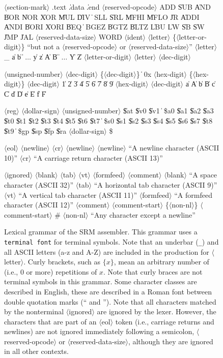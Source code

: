 \documentclass[11pt,letterpaper]{article}
\renewcommand{\nonterm}[1]{\mbox{$\langle$\textrm{#1}$\rangle$}}
\renewcommand{\arbno}[1]{\{#1\}}
\begin{document}
\begin{figure}
\begin{grammar}
\nonterm{section-mark} \: .text \| .data \| .end
\nonterm{reserved-opcode} \: ADD \| SUB \| AND \| BOR \| NOR \| XOR \| MUL \| DIV
\> \| \> SLL \| SRL \| MFHI \| MFLO \| JR \| ADDI \| ANDI \| BORI \| XORI \| BEQ
\> \| \> BGEZ \| BGTZ \| BLTZ \| LBU \| LW \| SB \| SW \| JMP \| JAL
\nonterm{reserved-data-size} \: WORD
\nonterm{ident} \: \nonterm{letter} \arbno{\nonterm{letter-or-digit}} \textrm{``but not a \nonterm{reserved-opcode} or \nonterm{reserved-data-size}''}
\nonterm{letter} \: \_ \| a \| b \| $\ldots$ \| y \| z \| A \| B \| $\ldots$ \| Y \| Z
\nonterm{letter-or-digit} \: \nonterm{letter} \| \nonterm{dec-digit}

\nonterm{unsigned-number} \: \nonterm{dec-digit} \arbno{\nonterm{dec-digit}}
 \> \| \> 0x \nonterm{hex-digit}  \arbno{\nonterm{hex-digit}}
\nonterm{dec-digit}  \| 1 \| 2 \| 3 \| 4 \| 5 \| 6 \| 7 \| 8 \| 9
\nonterm{hex-digit} \: \nonterm{dec-digit} \| a \| A \| b \| B \| c \| C \| d \| D \| e \| E \| f \| F

\nonterm{reg} \: \nonterm{dollar-sign} \nonterm{unsigned-number} \| \$at \| \$v0 \| \$v1
\> \| \> \$a0 \| \$a1 \| \$a2 \| \$a3 \| \$t0 \| \$t1 \| \$t2 \| \$t3 \| \$t4 \| \$t5 \| \$t6 \| \$t7
\> \| \> \$s0 \| \$s1 \| \$s2 \| \$s3 \| \$s4 \| \$s5 \| \$s6 \| \$s7 \| \$t8 \| \$t9
\> \| \> \$gp \| \$sp \| \$fp \| \$ra
\nonterm{dollar-sign} \: \$

\nonterm{eol} \: \nonterm{newline} \| \nonterm{cr} \nonterm{newline}
\nonterm{newline} \: \textrm{``A newline character (ASCII 10)''}
\nonterm{cr} \: \textrm{``A carriage return character (ASCII 13)''}

\nonterm{ignored} \: \nonterm{blank} \| \nonterm{tab} \| \nonterm{vt} \| \nonterm{formfeed} \| \nonterm{comment}
\nonterm{blank} \: \textrm{``A space character (ASCII 32)''}
\nonterm{tab} \: \textrm{``A horizontal tab character (ASCII 9)''}
\nonterm{vt} \: \textrm{``A vertical tab character (ASCII 11)''}
\nonterm{formfeed} \: \textrm{``A formfeed character (ASCII 12)''}
\nonterm{comment} \: \nonterm{comment-start} \arbno{\nonterm{non-nl}}
\nonterm{comment-start} \: \#
\nonterm{non-nl} \: \textrm{``Any character except a newline''}
\end{grammar}
\caption{
  Lexical grammar of the SRM assembler.
  This grammar uses a \texttt{terminal font}
  for terminal symbols. Note that an underbar (\texttt{\_}) and
  all ASCII letters (a-z and A-Z) are included in the production
  for \nonterm{letter}.
  Curly brackets, such as $\arbno{x}$, mean an arbitrary number of
  (i.e., 0 or more) repetitions of $x$.
  Note that curly braces are not terminal symbols in this grammar.
  Some character classes are described in English, these are described
  in a Roman font between double quotation marks (`` and '').
  Note that all characters matched by the nonterminal
  \nonterm{ignored} are ignored by the lexer.
  However, the characters that are part of an \nonterm{eol} token
  (i.e., carriage returns and newlines) are
  not ignored immediately following a semicolon,
  \nonterm{reserved-opcode} or \nonterm{reserved-data-size}, although
  they are ignored in all other contexts.
  }
\label{fig:lexical-grammar}
\end{figure}
\end{document}
